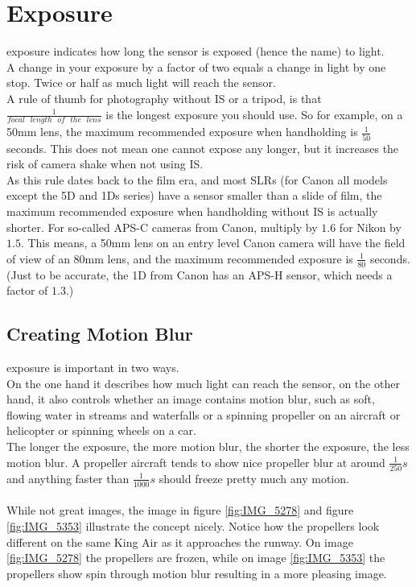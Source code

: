 \section{Exposure}
\label{sec:Exposure}

\Gls{exposure} indicates how long the sensor is exposed (hence the name) to light.
\\
A change in your \gls{exposure} by a factor of two equals a change in light by one \gls{stop}. Twice or half as much light will reach the sensor.
\\
A rule of thumb for photography without \gls{IS} or a tripod, is that $\frac{1}{focal\mbox{ }length\mbox{ }of\mbox{ }the\mbox{ }lens}$ is the longest \gls{exposure} you should use. So for example, on a 50mm lens, the maximum recommended \gls{exposure} when handholding is $\frac{1}{50}$ seconds. This does not mean one cannot expose any longer, but it increases the risk of camera shake when not using \gls{IS}.
\\
As this rule dates back to the film era, and most \glspl{SLR} (for Canon all models except the 5D and 1Ds series) have a \gls{sensor} smaller than a slide of film, the maximum recommended \gls{exposure} when handholding without \gls{IS} is actually shorter. For so-called \gls{APS-C} cameras from Canon, multiply by $1.6$ for Nikon by $1.5$. This means, a 50mm lens on an entry level Canon camera will have the field of view of an 80mm lens, and the maximum recommended \gls{exposure} is $\frac{1}{80}$ seconds.
(Just to be accurate, the 1D from Canon has an \gls{APS-H} \gls{sensor}, which needs a factor of $1.3$.)


\subsection{Creating Motion Blur}

\Gls{exposure} is important in two ways.
\\
On the one hand it describes how much light can reach the \gls{sensor}, on the other hand, it also controls whether an image contains motion blur, such as soft, flowing water in streams and waterfalls or a spinning propeller on an aircraft or helicopter or spinning wheels on a car.
\\
The longer the \gls{exposure}, the more motion blur, the shorter the exposure, the less motion blur. A propeller aircraft tends to show nice propeller blur at around $\frac{1}{250}s$ and anything faster than $\frac{1}{1000}s$ should freeze pretty much any motion.
\\
\\
While not great images, the image in figure \ref{fig:IMG_5278} and figure \ref{fig:IMG_5353} illustrate the concept nicely. Notice how the propellers look different on the same King Air as it approaches the runway. On image \ref{fig:IMG_5278} the propellers are frozen, while on image \ref{fig:IMG_5353} the propellers show spin through motion blur resulting in a more pleasing image.

